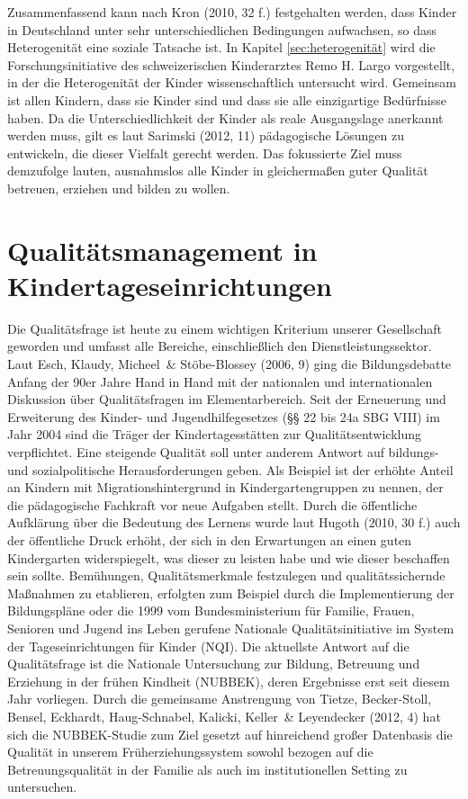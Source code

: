 Zusammenfassend kann nach Kron (2010, 32 f.) festgehalten werden, dass Kinder in Deutschland unter sehr unterschiedlichen Bedingungen aufwachsen, so dass Heterogenität eine soziale Tatsache ist. In Kapitel \ref{sec:heterogenität} wird die Forschungsinitiative des schweizerischen Kinderarztes Remo H. Largo vorgestellt, in der die Heterogenität der Kinder wissenschaftlich untersucht wird. 
Gemeinsam ist allen Kindern, dass sie Kinder sind und dass sie alle einzigartige Bedürfnisse haben. 
Da die Unterschiedlichkeit der Kinder als reale Ausgangslage anerkannt werden muss, gilt es laut Sarimski (2012, 11) pädagogische Lösungen zu entwickeln, die dieser Vielfalt gerecht werden. Das fokussierte Ziel muss demzufolge lauten, ausnahmslos alle Kinder in gleichermaßen guter Qualität betreuen, erziehen und bilden zu wollen.  


\section{Qualitätsmanagement in Kindertageseinrichtungen}

Die Qualitätsfrage ist heute zu einem wichtigen Kriterium unserer Gesellschaft geworden und umfasst alle Bereiche, einschließlich den Dienstleistungssektor. Laut Esch, Klaudy, Micheel~\& Stöbe-Blossey (2006, 9) ging die Bildungsdebatte Anfang der 90er Jahre Hand in Hand mit der nationalen und internationalen Diskussion über Qualitätsfragen im Elementarbereich. Seit der Erneuerung und Erweiterung des Kinder- und Jugendhilfegesetzes (§§ 22 bis 24a SBG VIII) im Jahr 2004 sind die Träger der Kindertagesstätten zur Qualitätsentwicklung verpflichtet. Eine steigende Qualität soll unter anderem Antwort auf bildungs- und sozialpolitische Herausforderungen geben. Als Beispiel ist der erhöhte Anteil an Kindern mit Migrationshintergrund in Kindergartengruppen zu nennen, der die pädagogische Fachkraft vor neue Aufgaben stellt.
Durch die öffentliche Aufklärung über die Bedeutung des Lernens wurde laut Hugoth (2010, 30 f.) auch der öffentliche Druck erhöht, der sich in den Erwartungen an einen guten Kindergarten widerspiegelt, was dieser zu leisten habe und wie dieser beschaffen sein sollte. 
Bemühungen, Qualitätsmerkmale festzulegen und qualitätssichernde Maßnahmen zu etablieren, erfolgten zum Beispiel durch die Implementierung der Bildungspläne oder die 1999 vom Bundesministerium für Familie, Frauen, Senioren und Jugend ins Leben gerufene Nationale Qualitätsinitiative im System der Tageseinrichtungen für Kinder (NQI). 
Die aktuellste Antwort auf die Qualitätsfrage ist die Nationale Untersuchung zur Bildung, Betreuung und Erziehung in der frühen Kindheit (NUBBEK), deren Ergebnisse erst seit diesem Jahr vorliegen. Durch die gemeinsame Anstrengung von Tietze, Becker-Stoll, Bensel, Eckhardt, Haug-Schnabel, Kalicki, Keller~\& Leyendecker (2012, 4) hat sich die  NUBBEK-Studie zum Ziel gesetzt auf hinreichend großer Datenbasis die Qualität in unserem Früherziehungssystem sowohl bezogen auf die Betreuungsqualität in der Familie als auch im institutionellen Setting zu untersuchen. 
  
